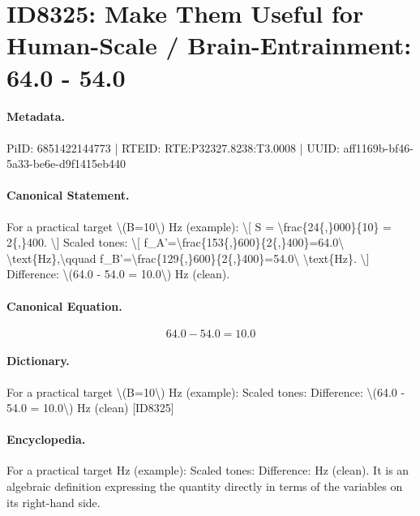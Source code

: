 \section*{ID8325: Make Them Useful for Human-Scale / Brain-Entrainment: 64.0 - 54.0}
\paragraph{Metadata.}
PiID: 6851422144773 | RTEID: RTE:P32327.8238:T3.0008 | UUID: aff1169b-bf46-5a33-be6e-d9f1415eb440

\paragraph{Canonical Statement.}
For a practical target \textbackslash{}(B=10\textbackslash{}) Hz (example): \textbackslash{}[ S = \textbackslash{}frac\{24\{,\}000\}\{10\} = 2\{,\}400. \textbackslash{}] Scaled tones: \textbackslash{}[ f\_A'=\textbackslash{}frac\{153\{,\}600\}\{2\{,\}400\}=64.0\textbackslash{} \textbackslash{}text\{Hz\},\textbackslash{}qquad f\_B'=\textbackslash{}frac\{129\{,\}600\}\{2\{,\}400\}=54.0\textbackslash{} \textbackslash{}text\{Hz\}. \textbackslash{}] Difference: \textbackslash{}(64.0 - 54.0 = 10.0\textbackslash{}) Hz (clean).

\paragraph{Canonical Equation.}
\[
64.0 - 54.0 = 10.0
\]

\paragraph{Dictionary.}
For a practical target \textbackslash{}(B=10\textbackslash{}) Hz (example): Scaled tones: Difference: \textbackslash{}(64.0 - 54.0 = 10.0\textbackslash{}) Hz (clean) [ID8325]

\paragraph{Encyclopedia.}
For a practical target Hz (example): Scaled tones: Difference: Hz (clean). It is an algebraic definition expressing the quantity directly in terms of the variables on its right-hand side.
